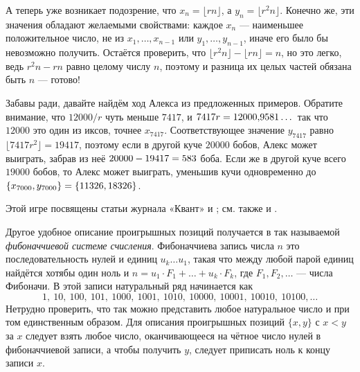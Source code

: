 А теперь уже возникает подозрение, что $x_n=\lfloor rn\rfloor$, а $y_n=\lfloor r^2 n\rfloor$.
Конечно же, эти значения обладают желаемыми свойствами:
каждое $x_n$ --- наименьшее положительное число, не из $x_1, \dots , x_{n-1}$ или $y_1, \dots, y_{n-1}$, иначе его было бы невозможно получить.
Остаётся проверить, что $\lfloor r^2 n\rfloor - \lfloor rn\rfloor = n$, но это легко, ведь $r^2 n - rn$ равно целому числу $n$,
поэтому и разница их целых частей обязана быть $n$ --- готово!

Забавы ради, давайте найдём ход Алекса из предложенных примеров.
Обратите внимание, что $12 000/r$ чуть меньше $7417$, и $7417r \z= 12 000{,}9581\dots$ так что $12 000$ это один из иксов, точнее $x_{7417}$.
Соответствующее значение $y_{7417}$ равно $\lfloor 7417r^2\rfloor = 19 417$, поэтому если в другой куче $20 000$ бобов, Алекс может выиграть, забрав из неё $20 000 \z- 19 417 = 583$ боба.
Если же в другой куче всего $19 000$ бобов, то Алекс может выиграть, уменьшив кучи одновременно до $\{x_{7000}, y_{7000}\} \z= \{11 326, 18 326\}$.

\begin{addedbytheeditors}
Этой игре посвящены статьи журнала «Квант»
\cite{matulis-savukinas} и \cite{yaglom_kvant}; см. также \cite[задача 129]{yaglom-yaglom} и \cite[разделы 6.6---6.7]{graham-knut-patashnik}.

Другое удобное описание проигрышных позиций получается в так называемой \emph{фибоначчиевой системе счисления}.
Фибоначчиева запись числа $n$ это последовательность нулей и единиц $u_k\dots u_1$, такая что между любой парой единиц найдётся хотябы один ноль и $n=u_1\cdot F_1+\dots+u_k\cdot F_k$, где $F_1,F_2,\dots$ --- числа Фибоначи.
В этой записи натуральный ряд начинается как 
\[1,\ 10,\ 100,\ 101,\ 1000,\ 1001,\ 1010,\ 10000,\ 10001,\ 10010,\ 10100,\dots\]
Нетрудно проверить, что так можно представить любое натуральное число и при том единственным образом.
Для описания проигрышных позиций $\{x,y\}$ с $x<y$ за $x$ следует взять любое число, оканчивающееся на чётное число нулей в фибоначчиевой записи, а чтобы получить $y$, следует приписать ноль к концу записи $x$.
\pr
\end{addedbytheeditors}
